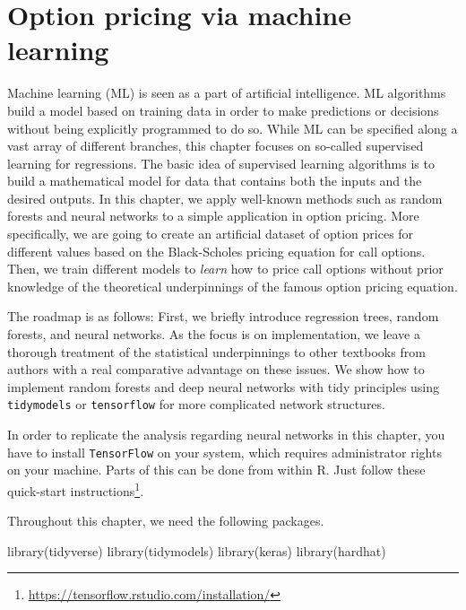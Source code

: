 \documentclass[
]{krantz}
\newenvironment{Shaded}{\begin{snugshade}}{\end{snugshade}}
\newcommand{\FunctionTok}[1]{\textcolor[rgb]{0,0,0}{#1}}
\newcommand{\NormalTok}[1]{#1}
\renewcommand{\href}[2]{#2\footnote{\url{#1}}}
\begin{document}
\hypertarget{option-pricing-via-machine-learning}{%
\chapter{Option pricing via machine learning}\label{option-pricing-via-machine-learning}}

Machine learning (ML) is seen as a part of artificial intelligence.
ML algorithms build a model based on training data in order to make predictions or decisions without being explicitly programmed to do so.
While ML can be specified along a vast array of different branches, this chapter focuses on so-called supervised learning for regressions. The basic idea of supervised learning algorithms is to build a mathematical model for data that contains both the inputs and the desired outputs. In this chapter, we apply well-known methods such as random forests and neural networks to a simple application in option pricing. More specifically, we are going to create an artificial dataset of option prices for different values based on the Black-Scholes pricing equation for call options. Then, we train different models to \emph{learn} how to price call options without prior knowledge of the theoretical underpinnings of the famous option pricing equation.

The roadmap is as follows: First, we briefly introduce regression trees, random forests, and neural networks. As the focus is on implementation, we leave a thorough treatment of the statistical underpinnings to other textbooks from authors with a real comparative advantage on these issues.
We show how to implement random forests and deep neural networks with tidy principles using \texttt{tidymodels} or \texttt{tensorflow} for more complicated network structures.

In order to replicate the analysis regarding neural networks in this chapter, you have to install \texttt{TensorFlow} on your system, which requires administrator rights on your machine. Parts of this can be done from within R. Just follow \href{https://tensorflow.rstudio.com/installation/}{these quick-start instructions}.

Throughout this chapter, we need the following packages.

\begin{Shaded}
\begin{Highlighting}[]
\FunctionTok{library}\NormalTok{(tidyverse)}
\FunctionTok{library}\NormalTok{(tidymodels)}
\FunctionTok{library}\NormalTok{(keras)}
\FunctionTok{library}\NormalTok{(hardhat)}
\end{Highlighting}
\end{Shaded}
\end{document}
